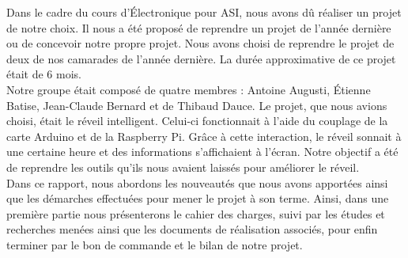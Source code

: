 Dans le cadre du cours d'Électronique pour ASI, nous avons dû réaliser un projet de notre choix. Il nous a été proposé de reprendre un projet de l'année dernière ou de concevoir notre propre projet. Nous avons choisi de reprendre le projet de deux de nos camarades de l'année dernière. La durée approximative de ce projet était de 6 mois.\\

Notre groupe était composé de quatre membres : Antoine Augusti, Étienne Batise, Jean-Claude Bernard et de Thibaud Dauce. Le projet, que nous avions choisi, était le réveil intelligent. Celui-ci fonctionnait à l'aide du couplage de la carte Arduino et de la Raspberry Pi. Grâce à cette interaction, le réveil sonnait à une certaine heure et  des informations s'affichaient à l'écran. Notre objectif a été de reprendre les outils qu'ils nous avaient laissés pour améliorer le réveil.\\

Dans ce rapport, nous abordons les nouveautés que nous avons apportées ainsi que les démarches effectuées pour mener le projet à son terme. Ainsi, dans une première partie nous présenterons le cahier des charges, suivi par les études et recherches menées ainsi que les documents de réalisation associés, pour enfin terminer par le bon de commande et le bilan de notre projet.